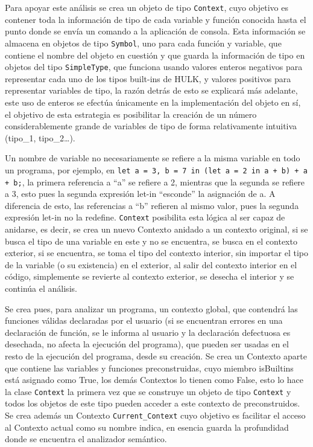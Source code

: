 \documentclass{article}
\begin{document}
Para apoyar este análisis se crea un objeto de tipo \texttt{Context}, cuyo objetivo es contener toda la información de tipo de cada variable y función conocida hasta el punto donde se envía un comando a la aplicación de consola. Esta información se almacena en objetos de tipo \texttt{Symbol}, uno para cada función y variable, que contiene el nombre del objeto en cuestión y que guarda la información de tipo en objetos del tipo \texttt{SimpleType}, que funciona usando valores enteros negativos para representar cada uno de los tipos built-ins de HULK, y valores positivos para representar variables de tipo, la razón detrás de esto se explicará más adelante, este uso de enteros se efectúa únicamente en la implementación del objeto en sí, el objetivo de esta estrategia es posibilitar la creación de un número considerablemente grande de variables de tipo de forma relativamente intuitiva (tipo\_1, tipo\_2…).

Un nombre de variable no necesariamente se refiere a la misma variable en todo un programa, por ejemplo, en \texttt{let a = 3, b = 7 in (let a = 2 in a + b) + a + b;}, la primera referencia a “a” se refiere a 2, mientras que la segunda se refiere a 3, esto pues la segunda expresión let-in “esconde” la asignación de a. A diferencia de esto, las referencias a “b” refieren al mismo valor, pues la segunda expresión let-in no la redefine. \texttt{Context} posibilita esta lógica al ser capaz de anidarse, es decir, se crea un nuevo Contexto anidado a un contexto original, si se busca el tipo de una variable en este y no se encuentra, se busca en el contexto exterior, si se encuentra, se toma el tipo del contexto interior, sin importar el tipo de la variable (o su existencia) en el exterior, al salir del contexto interior en el código, simplemente se revierte al contexto exterior, se desecha el interior y se continúa el análisis. 

Se crea pues, para analizar un programa, un contexto global, que contendrá las funciones válidas declaradas por el usuario (si se encuentran errores en una declaración de función, se le informa al usuario y la declaración defectuosa es desechada, no afecta la ejecución del programa), que pueden ser usadas en el resto de la ejecución del programa, desde su creación. Se crea un Contexto aparte que contiene las variables y funciones preconstruidas, cuyo miembro isBuiltins está asignado como True, los demás Contextos lo tienen como False, esto lo hace la clase \texttt{Context} la primera vez que se construye un objeto de tipo \texttt{Context} y todos los objetos de este tipo pueden acceder a este contexto de preconstruidos. Se crea además un Contexto \texttt{Current\_Context} cuyo objetivo es facilitar el acceso al Contexto actual como su nombre indica, en esencia guarda la profundidad donde se encuentra el analizador semántico.
\end{document}
